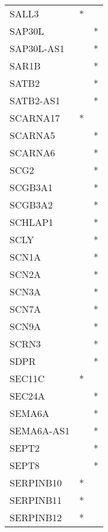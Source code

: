 \begin{longtable}{lcc}
SALL3           &              * &            \\
SAP30L          &                &          * \\
SAP30L-AS1      &                &          * \\
SAR1B           &                &          * \\
SATB2           &                &          * \\
SATB2-AS1       &                &          * \\
SCARNA17        &              * &            \\
SCARNA5         &                &          * \\
SCARNA6         &                &          * \\
SCG2            &                &          * \\
SCGB3A1         &                &          * \\
SCGB3A2         &                &          * \\
SCHLAP1         &                &          * \\
SCLY            &                &          * \\
SCN1A           &                &          * \\
SCN2A           &                &          * \\
SCN3A           &                &          * \\
SCN7A           &                &          * \\
SCN9A           &                &          * \\
SCRN3           &                &          * \\
SDPR            &                &          * \\
SEC11C          &              * &            \\
SEC24A          &                &          * \\
SEMA6A          &                &          * \\
SEMA6A-AS1      &                &          * \\
SEPT2           &                &          * \\
SEPT8           &                &          * \\
SERPINB10       &              * &            \\
SERPINB11       &              * &            \\
SERPINB12       &              * &            \\

\end{longtable}
